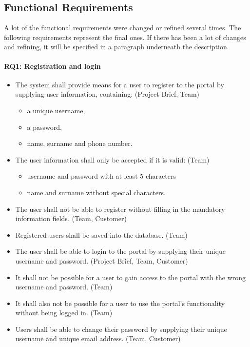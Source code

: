 \subsection{Functional Requirements}
A lot of the functional requirements were changed or refined several times.
The following requirements represent the final ones.
If there has been a lot of changes and refining, it will be specified in a paragraph underneath the description.

\paragraph{RQ1: Registration and login}
\begin{itemize}
    \item The system shall provide means for a user to register to the portal by supplying user information, containing:  (Project Brief, Team)
        \begin{itemize}
            \item a unique username,
            \item a password,
            \item name, surname and phone number.
        \end{itemize}
    \item The user information shall only be accepted if it is valid: (Team)
        \begin{itemize}
            \item username and password with at least 5 characters
            \item name and surname without special characters.
        \end{itemize}
    \item The user shall not be able to register without filling in the mandatory information fields. (Team, Customer)
    \item Registered users shall be saved into the database. (Team)
    \item The user shall be able to login to the portal by supplying their unique username and password. (Project Brief, Team, Customer)
    \item It shall not be possible for a user to gain access to the portal with the wrong username and password. (Team)
    \item It shall also not be possible for a user to use the portal's functionality without being logged in. (Team)
    \item Users shall be able to change their password by supplying their unique username and unique email address. (Team, Customer)

\end{itemize}
